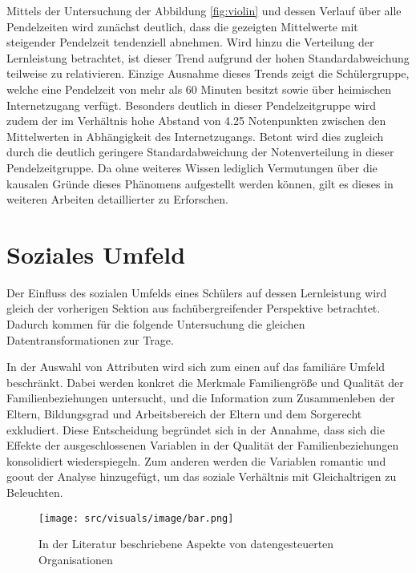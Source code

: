 Mittels der Untersuchung der Abbildung \ref{fig:violin} und dessen Verlauf über alle Pendelzeiten wird zunächst deutlich, dass die gezeigten Mittelwerte mit steigender Pendelzeit tendenziell abnehmen. 
Wird hinzu die Verteilung der Lernleistung betrachtet, ist dieser Trend aufgrund der hohen Standardabweichung teilweise zu relativieren.
Einzige Ausnahme dieses Trends zeigt die Schülergruppe, welche eine Pendelzeit von mehr als 60 Minuten besitzt sowie über heimischen Internetzugang verfügt.
Besonders deutlich in dieser Pendelzeitgruppe wird zudem der im Verhältnis hohe Abstand von 4.25 Notenpunkten zwischen den Mittelwerten in Abhängigkeit des Internetzugangs.
Betont wird dies zugleich durch die deutlich geringere Standardabweichung der Notenverteilung in dieser Pendelzeitgruppe.
Da ohne weiteres Wissen lediglich Vermutungen über die kausalen Gründe dieses Phänomens aufgestellt werden können, gilt es dieses in weiteren Arbeiten detaillierter zu Erforschen.


\section{Soziales Umfeld}

Der Einfluss des sozialen Umfelds eines Schülers auf dessen Lernleistung wird gleich der vorherigen Sektion aus fachübergreifender Perspektive betrachtet.
Dadurch kommen für die folgende Untersuchung die gleichen Datentransformationen zur Trage.

In der Auswahl von Attributen wird sich zum einen auf das familiäre Umfeld beschränkt. 
Dabei werden konkret die Merkmale Familiengröße und Qualität der Familienbeziehungen untersucht, und die Information zum Zusammenleben der Eltern, Bildungsgrad und Arbeitsbereich der Eltern und dem Sorgerecht exkludiert.
Diese Entscheidung begründet sich in der Annahme, dass sich die Effekte der ausgeschlossenen Variablen in der Qualität der Familienbeziehungen konsolidiert wiederspiegeln.
Zum anderen werden die Variablen romantic und goout der Analyse hinzugefügt, um das soziale Verhältnis mit Gleichaltrigen zu Beleuchten.

\begin{figure}[htb]
    \centering
    \texttt{[image: src/visuals/image/bar.png]}
    \caption{In der Literatur beschriebene Aspekte von datengesteuerten Organisationen}
    \label{fig:bar}
\end{figure}

